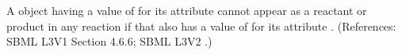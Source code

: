 A \Species object having a value of  for its attribute
 cannot appear as a reactant or product in any
reaction if that \Species also has a value of  for its attribute
.  (References: SBML L3V1 Section 4.6.6; SBML L3V2
.)
